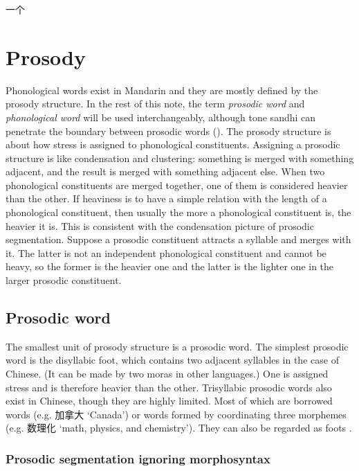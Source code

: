 \documentclass[UTF8, a4paper, oneside, scheme=plain, 12pt]{ctexrep}
\newcommand*{\citesec}[1]{\S~{#1}}
\newcommand*{\term}[1]{\emph{#1}}
\newcommand{\translate}[1]{`#1'}
\begin{document}
一个

\section{Prosody}\label{sec:prosody-structure}

Phonological words exist in Mandarin 
and they are mostly defined by the prosody structure.
In the rest of this note,
the term \term{prosodic word} and \term{phonological word}
will be used interchangeably, 
although tone sandhi can penetrate 
the boundary between prosodic words
().
The prosody structure is about how stress is assigned to phonological constituents.
Assigning a prosodic structure is like condensation and clustering:
something is merged with something adjacent,
and the result is merged with something adjacent else.
When two phonological constituents are merged together,
one of them is considered heavier than the other.
If heaviness is to have a simple relation with the length of a phonological constituent,
then usually the more a phonological constituent is,
the heavier it is.
This is consistent with the condensation picture of prosodic segmentation.
Suppose a prosodic constituent attracts a syllable and merges with it.
The latter is not an independent phonological constituent
and cannot be heavy,
so the former is the heavier one and the latter is the lighter one in the larger prosodic constituent.

\subsection{Prosodic word}

The smallest unit of prosody structure 
is a prosodic word.
The simplest prosodic word is the disyllabic foot, 
which contains two adjacent syllables in the case of Chinese.
(It can be made by two moras in other languages.)
One is assigned stress and is therefore heavier than the other.
Trisyllabic prosodic words also exist in Chinese,
though they are highly limited.
Most of which are borrowed words (e.g. 加拿大 \translate{Canada})
or words formed by coordinating three morphemes (e.g. 数理化 \translate{math, physics, and chemistry}).
They can also be regarded as foots \citep[\citesec{2.2}]{feng2000}.

\subsubsection{Prosodic segmentation ignoring morphosyntax}\label{sec:prosody.word.ignorance}
\end{document}
